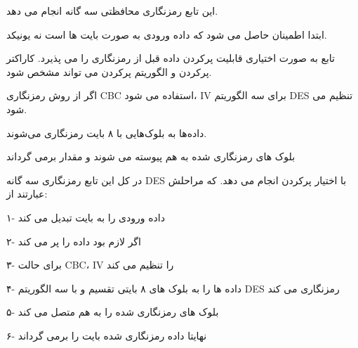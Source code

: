 
\begin{boxK}
    \lr{
        
    }   
\end{boxK}

\begin{boxB}
     این تابع رمزنگاری محافظتی سه گانه انجام می دهد.

ابتدا اطمینان حاصل می شود که داده ورودی به صورت بایت ها است نه یونیکد.

تابع به صورت اختیاری قابلیت پرکردن داده قبل از رمزنگاری را می پذیرد. کاراکتر پرکردن و الگوریتم پرکردن می تواند مشخص شود.

اگر از روش رمزنگاری CBC استفاده می شود، IV برای سه الگوریتم DES تنظیم می شود.


داده‌ها به بلوک‌هایی با ۸ بایت رمزنگاری می‌شوند.

بلوک های رمزنگاری شده به هم پیوسته می شوند و مقدار برمی گرداند


در کل این تابع رمزنگاری سه گانه DES با اختیار پرکردن انجام می دهد. که مراحلش عبارتند از:

۱- داده ورودی را به بایت تبدیل می کند

۲- اگر لازم بود داده را پر می کند

۳- برای حالت CBC، IV را تنظیم می کند

۴- داده ها را به بلوک های ۸ بایتی تقسیم و با سه الگوریتم DES رمزنگاری می کند

۵- بلوک های رمزنگاری شده را به هم متصل می کند

۶- نهایتا داده رمزنگاری شده بایت را برمی گرداند
\end{boxB}

\begin{boxK}
    \lr{
        
    }
\end{boxK}